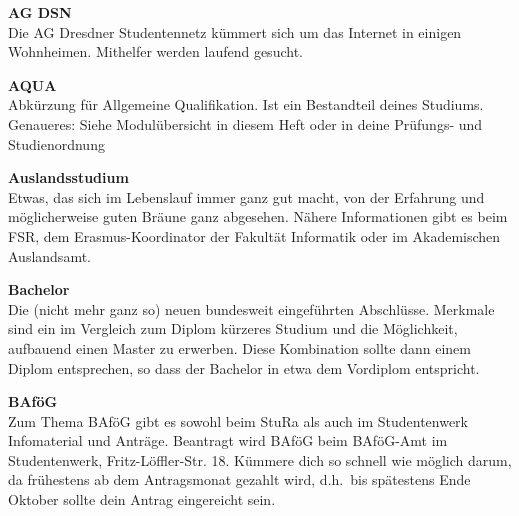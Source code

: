
\begin{multicols}{2}

\textbf{AG DSN} \\
Die AG Dresdner Studentennetz kümmert sich um das Internet in einigen Wohnheimen.
Mithelfer werden laufend gesucht.~



\textbf{AQUA} \\
Abkürzung für Allgemeine Qualifikation.
Ist ein Bestandteil deines Studiums.
Genaueres:
Siehe Modulübersicht in diesem Heft oder in deine Prüfungs- und Studienordnung %


\textbf{Auslandsstudium} \\
Etwas, das sich im Lebenslauf immer ganz gut macht, von der Erfahrung und möglicherweise guten Bräune ganz abgesehen.
Nähere Informationen gibt es beim FSR, dem Erasmus-Koordinator der Fakultät Informatik oder im Akademischen Auslandsamt.~

\textbf{Bachelor} \\
Die (nicht mehr ganz so) neuen bundesweit eingeführten Abschlüsse. %
Merkmale sind ein im Vergleich zum Diplom kürzeres Studium und die Möglichkeit, aufbauend einen Master zu erwerben. Diese Kombination sollte dann einem Diplom entsprechen, so dass der Bachelor in etwa dem Vordiplom entspricht.

\textbf{BAföG} \\
Zum Thema BAföG gibt es sowohl beim StuRa als auch im Studentenwerk Infomaterial und Anträge.
Beantragt wird BAföG beim BAföG-Amt im Studentenwerk, Fritz-Löffler-Str. 18.
Kümmere dich so schnell wie möglich darum, da frühestens ab dem Antragsmonat gezahlt wird, d.h.\ bis spätestens Ende Oktober sollte dein Antrag eingereicht sein.~


\end{multicols}
